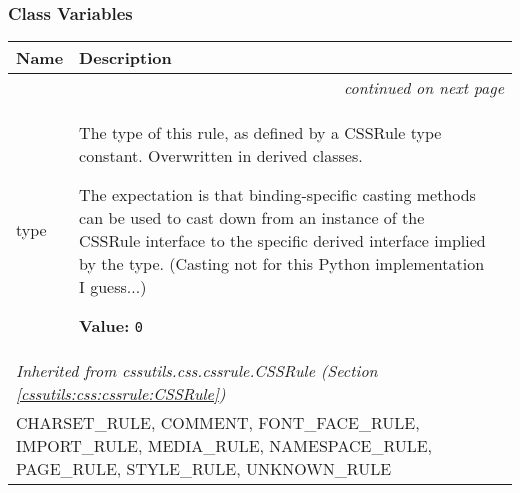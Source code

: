 
  \subsubsection{Class Variables}

    \vspace{-1cm}
\hspace{\varindent}\begin{longtable}{|p{\varnamewidth}|p{\vardescrwidth}|l}
\cline{1-2}
\cline{1-2} \centering \textbf{Name} & \centering \textbf{Description}& \\
\cline{1-2}
\endhead\cline{1-2}\multicolumn{3}{r}{\small\textit{continued on next page}}\\\endfoot\cline{1-2}
\endlastfoot\raggedright t\-y\-p\-e\- & \raggedright The type of this rule, as defined by a CSSRule type constant.
Overwritten in derived classes.

The expectation is that binding-specific casting methods can be used to
cast down from an instance of the CSSRule interface to the specific
derived interface implied by the type.
(Casting not for this Python implementation I guess...)

\textbf{Value:} 
{\tt 0}&\\
\cline{1-2}
\multicolumn{2}{|l|}{\textit{Inherited from cssutils.css.cssrule.CSSRule \textit{(Section \ref{cssutils:css:cssrule:CSSRule})}}}\\
\multicolumn{2}{|p{\varwidth}|}{\raggedright CHARSET\_RULE, COMMENT, FONT\_FACE\_RULE, IMPORT\_RULE, MEDIA\_RULE, NAMESPACE\_RULE, PAGE\_RULE, STYLE\_RULE, UNKNOWN\_RULE}\\
\cline{1-2}
\end{longtable}



